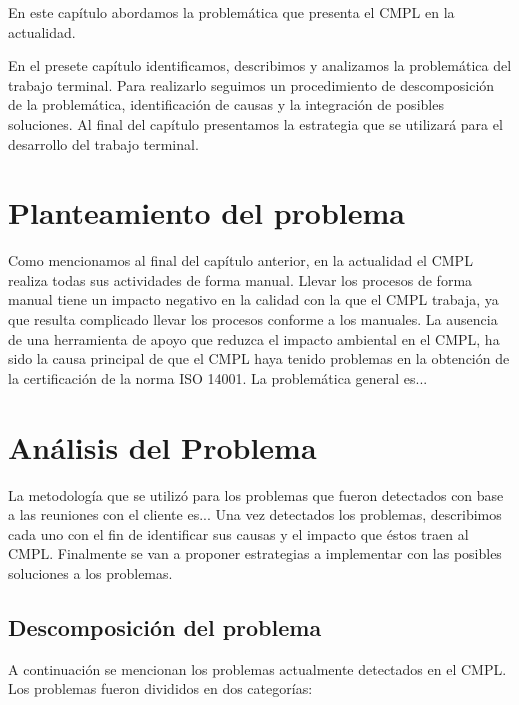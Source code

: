 En este capítulo abordamos la problemática que presenta el CMPL en la actualidad. 

En el presete capítulo identificamos, describimos y analizamos la problemática del trabajo terminal. Para realizarlo seguimos un procedimiento de descomposición de la problemática, identificación de causas y la integración de posibles soluciones. Al final del capítulo presentamos la estrategia que se utilizará para el desarrollo del trabajo terminal. 
\section{Planteamiento del problema}
Como mencionamos al final del capítulo anterior, en la actualidad el CMPL realiza todas sus actividades de forma manual. Llevar los procesos de forma manual tiene un impacto negativo en la calidad con la que el CMPL trabaja, ya que resulta complicado llevar los procesos conforme a los manuales. La ausencia de una herramienta de apoyo que reduzca el impacto ambiental en el CMPL, ha sido la causa principal de que el CMPL haya tenido problemas en la obtención de la certificación de la norma ISO 14001. La problemática general es...

\section{Análisis del Problema}
La metodología que se utilizó para los problemas que fueron detectados con base a las reuniones con el cliente es... Una vez detectados los problemas, describimos cada uno con el fin de identificar sus causas y el impacto que éstos traen al CMPL. Finalmente se van a proponer estrategias a implementar con las posibles soluciones a los problemas. 
	\subsection{Descomposición del problema}
	A continuación se mencionan los problemas actualmente detectados en el CMPL. Los problemas fueron divididos en dos categorías:
	
